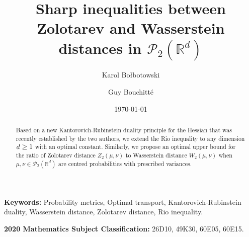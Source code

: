 \documentclass[11pt,reqno]{amsart}
\theoremstyle{definition}
\numberwithin{equation}{section}
\newcommand{\R}{\mathbb{R}}
\newcommand{\PP}{\mathcal{P}}
\begin{document}
	
	
	\title{ Sharp inequalities between Zolotarev and Wasserstein distances in $\PP_2(\R^d)$ } 
	
	
	
	
	
	
	\author{Karol Bo{\l}botowski \and Guy Bouchitt\'{e}}


	

	
	
	
	\date{\today}
	
	\begin{abstract}  
		Based on a new Kantorovich-Rubinstein duality principle for the Hessian that was recently established by the two authors,
		 we extend the Rio inequality to any dimension $d \ge  \nolinebreak 1$ with an optimal constant.  Similarly, we propose an optimal upper bound for the ratio  of Zolotarev distance $Z_2(\mu,\nu)$ to Wasserstein distance $W_2(\mu,\nu)$ when  $\mu,\nu \in \PP_2(\R^d)$  are centred probabilities with prescribed variances.  
 		\end{abstract}

\maketitle

\noindent \textbf{Keywords:}  Probability metrics,  Optimal transport, Kantorovich-Rubinstein duality,  Wasserstein distance, Zolotarev distance, Rio inequality.

\noindent \textbf{2020 Mathematics Subject Classification:}   26D10, 49K30, 60E05, 60E15.
	
	\dedicatory{}
	
	
	\maketitle
	
	
	\vskip1cm
\end{document}
